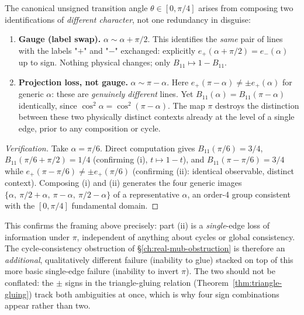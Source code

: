 \begin{proposition}
\label{prop:gauge-vs-loss}
The canonical unsigned transition angle $\theta \in [0,\pi/4]$ arises from composing
two identifications of \emph{different character}, not one redundancy in
disguise:
\begin{enumerate}
\item[(i)] \textbf{Gauge (label swap).} $\alpha \sim \alpha + \pi/2$. This
identifies the \emph{same} pair of lines with the labels "$+$" and "$-$"
exchanged: explicitly $e_+(\alpha+\pi/2) = e_-(\alpha)$ up to sign. Nothing
physical changes; only $B_{11} \mapsto 1 - B_{11}$.
\item[(ii)] \textbf{Projection loss, not gauge.} $\alpha \sim \pi - \alpha$.
Here $e_+(\pi-\alpha) \neq \pm e_+(\alpha)$ for generic $\alpha$: these are
\emph{genuinely different} lines. Yet $B_{11}(\alpha) = B_{11}(\pi-\alpha)$
identically, since $\cos^2\alpha = \cos^2(\pi-\alpha)$. The map $\pi$ destroys
the distinction between these two physically distinct contexts already at the
level of a single edge, prior to any composition or cycle.
\end{enumerate}
\end{proposition}

\begin{proof}[Verification]
Take $\alpha = \pi/6$. Direct computation gives $B_{11}(\pi/6) = 3/4$,
$B_{11}(\pi/6+\pi/2) = 1/4$ (confirming (i), $t \mapsto 1-t$), and
$B_{11}(\pi-\pi/6) = 3/4$ while $e_+(\pi-\pi/6) \neq \pm e_+(\pi/6)$ (confirming
(ii): identical observable, distinct context). Composing (i) and (ii) generates
the four generic images $\{\alpha,\ \pi/2+\alpha,\ \pi-\alpha,\ \pi/2-\alpha\}$
of a representative $\alpha$, an order-4 group consistent with the $[0,\pi/4]$
fundamental domain.
\end{proof}

\begin{remark}
This confirms the framing above precisely: part (ii) is a \emph{single}-edge
loss of information under $\pi$, independent of anything about cycles or
global consistency. The cycle-consistency obstruction of
\S\ref{ch:real-mub-obstruction} is therefore an \emph{additional},
qualitatively different failure (inability to glue) stacked on top of this more
basic single-edge failure (inability to invert $\pi$). The two should not be
conflated: the $\pm$ signs in the triangle-gluing relation
(Theorem~\ref{thm:triangle-gluing}) track both ambiguities at once, which is
why four sign combinations appear rather than two.
\end{remark}

